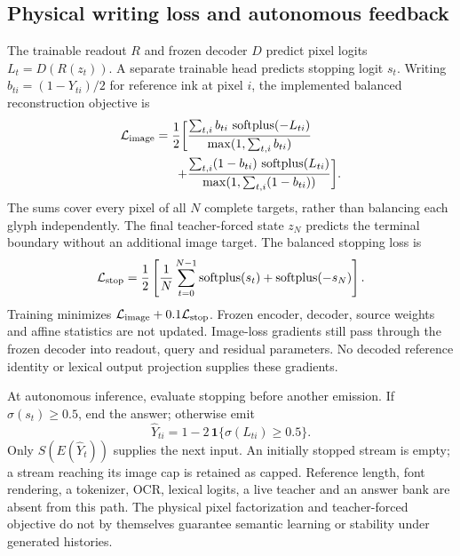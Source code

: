 \documentclass[12pt,a4paper]{article}
\providecommand{\DIFadd}[1]{{\protect\color{blue} \sf #1}} %
\begin{document}
\subsection*{\DIFadd{Physical writing loss and autonomous feedback}}
\DIFadd{The trainable readout $R$ and frozen decoder $D$ predict pixel logits
$L_t=D(R(z_t))$. A separate trainable head predicts stopping logit $s_t$.
Writing $b_{ti}=(1-Y_{ti})/2$ for reference ink at pixel $i$, the implemented
balanced reconstruction objective is
}\begin{equation}
 \begin{split}
 \mathcal L_{\rm image}=\frac{1}{2}\biggl[
 &\frac{\sum_{t,i}b_{ti}\,\operatorname{softplus}(-L_{ti})}{\max(1,\sum_{t,i}b_{ti})}\\
 +&\frac{\sum_{t,i}(1-b_{ti})\,\operatorname{softplus}(L_{ti})}{\max(1,\sum_{t,i}(1-b_{ti}))}\biggr].
 \end{split}
 \label{eq:continuation-image-loss}
\end{equation}
\DIFadd{The sums cover every pixel of all $N$ complete targets, rather than balancing
each glyph independently. The final teacher-forced state $z_N$ predicts the
terminal boundary without an additional image target. The balanced stopping loss is
}\begin{equation}
 \mathcal L_{\rm stop}=\frac{1}{2}\left[
 \frac{1}{N}\sum_{t=0}^{N-1}\operatorname{softplus}(s_t)
 +\operatorname{softplus}(-s_N)\right].
 \label{eq:continuation-stop-loss}
\end{equation}
\DIFadd{Training minimizes $\mathcal L_{\rm image}+0.1\mathcal L_{\rm stop}$.
Frozen encoder, decoder, source weights and affine statistics are not updated.
Image-loss gradients still pass through the frozen decoder into readout,
query and residual parameters. No decoded reference identity or lexical output
projection supplies these gradients.
}

\DIFadd{At autonomous inference, evaluate stopping before another emission. If
$\sigma(s_t)\geq0.5$, end the answer; otherwise emit
}\begin{equation}
 \widehat Y_{ti}=1-2\,\mathbf1\{\sigma(L_{ti})\geq0.5\}.
 \label{eq:continuation-emission}
\end{equation}
\DIFadd{Only $S(E(\widehat Y_t))$ supplies the next input. An initially stopped stream
is empty; a stream reaching its image cap is retained as capped. Reference
length, font rendering, a tokenizer, OCR, lexical logits, a live teacher and an
answer bank are absent from this path. The physical pixel factorization and
teacher-forced objective do not by themselves guarantee semantic learning or
stability under generated histories.
}
\end{document}
